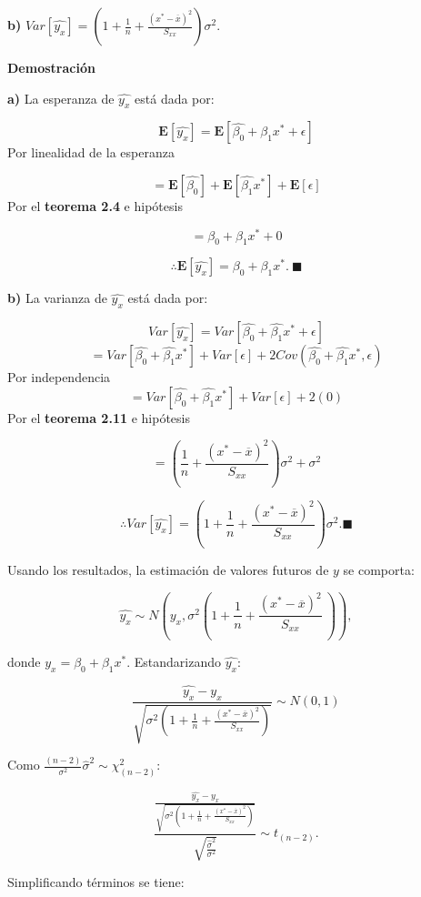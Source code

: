 \documentclass[
  a4paper,
  oneside,
  openany]{book}
\begin{document}
\textbf{b)} \(Var\left[\hat{y_{x}}\right]=\left(1+ \frac{1}{n}+\frac{(x^*-\overline{x})^2}{S_{xx}}\right)\sigma^2.\)

\textbf{Demostración}

\textbf{a)} La esperanza de \(\hat{y_{x}}\) está dada por:

\[\mathbf{E}\left[\hat{y_{x}}\right]=\mathbf {E}\left[\hat{\beta_{0}}+\hat{\beta_{1}}x^*+ \epsilon\right]\]
Por linealidad de la esperanza

\[=\mathbf{E}\left[\hat{\beta_{0}}\right]+\mathbf{E}\left[\hat{\beta_{1}}x^*\right]+ \mathbf{E}\left[\epsilon\right]\]
Por el \textbf{teorema 2.4} e hipótesis

\[=\beta_{0}+\beta_{1}x^*+0\]

\[\therefore \mathbf{E}\left[\hat{y_{x}}\right]=\beta_{0}+\beta_{1}x^*. \ \blacksquare\]

\textbf{b)} La varianza de \(\hat{y_{x}}\) está dada por:

\[Var\left[\hat{y_{x}}\right]=Var\left[\hat{\beta_{0}}+\hat{\beta_{1}}x^*+\epsilon\right]\]
\[=Var\left[\hat{\beta_{0}}+\hat{\beta_{1}}x^*\right]+Var\left[\epsilon\right]+2Cov(\hat{\beta_{0}}+\hat{\beta_{1}}x^*,\epsilon)\]
Por independencia
\[=Var\left[\hat{\beta_{0}}+\hat{\beta_{1}}x^*\right]+Var\left[\epsilon\right]+2(0)\]
Por el \textbf{teorema 2.11} e hipótesis

\[=\left(\frac{1}{n}+\frac{(x^*-\overline{x})^2}{S_{xx}}\right)\sigma^2+\sigma^2\]

\[\therefore Var\left[\hat{y_{x}}\right]=\left(1+ \frac{1}{n}+\frac{(x^*-\overline{x})^2}{S_{xx}}\right)\sigma^2. \blacksquare\]

Usando los resultados, la estimación de valores futuros de \(y\) se comporta:

\[\hat{y_{x}} \sim N \left(y_{x},\sigma^2\left(1+ \frac{1}{n}+\frac{(x^*-\overline{x})^2}{S_{xx}} \ \right)\right),\]

donde \(y_{x}=\beta_{0}+\beta_{1}x^*.\) Estandarizando \(\hat{y_{x}}:\)

\[\frac{\hat{y_{x}}-y_{x}}{\sqrt{\sigma^2\left(1+ \frac{1}{n}+\frac{(x^*-\overline{x})^2}{S_{xx}}\right)}}\sim N (0,1)\]

Como \(\frac{(n-2)}{\sigma^2}\hat{\sigma}^2 \sim \chi^2_{(n-2)}\):

\[\frac{\frac{\hat{y_{x}}-y_{x}}{\sqrt{\sigma^2\left(1+ \frac{1}{n}+\frac{(x^*-\overline{x})^2}{S_{xx}}\right)}}}{\sqrt{\frac{\hat{\sigma}^2}{\sigma^2}}}\sim t_{(n-2)}.\]

Simplificando términos se tiene:
\end{document}
